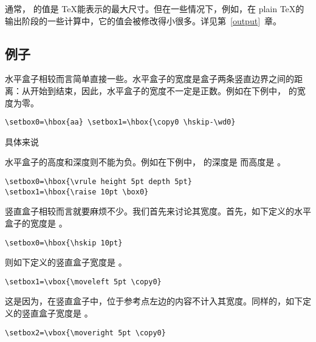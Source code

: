 \documentclass{book}
\begin{document}
通常， 的值是 \TeX 能表示的最大尺寸。但在一些情况下，例如，在 plain \TeX 的输出阶段的一些计算中，它的值会被修改得小很多。详见第~\ref{output}~章。

\subsection{例子}

水平盒子相较而言简单直接一些。水平盒子的宽度是盒子两条竖直边界之间的距离：从开始到结束，因此，水平盒子的宽度不一定是正数。例如在下例中， 的宽度为零。
\begin{verbatim}
\setbox0=\hbox{aa} \setbox1=\hbox{\copy0 \hskip-\wd0}
\end{verbatim}
具体来说
水平盒子的高度和深度则不能为负。例如在下例中， 的深度是 \n{0pt} 而高度是 \n{15pt}。
\begin{verbatim}
\setbox0=\hbox{\vrule height 5pt depth 5pt}
\setbox1=\hbox{\raise 10pt \box0}
\end{verbatim}

竖直盒子相较而言就要麻烦不少。我们首先来讨论其宽度。首先，如下定义的水平盒子的宽度是 \n{10pt}。
\begin{verbatim}
\setbox0=\hbox{\hskip 10pt}
\end{verbatim}
则如下定义的竖直盒子宽度是 \n{5pt}。
\begin{verbatim}
\setbox1=\vbox{\moveleft 5pt \copy0}
\end{verbatim}
这是因为，在竖直盒子中，位于参考点左边的内容不计入其宽度。同样的，如下定义的竖直盒子宽度是 \n{15pt}。
\begin{verbatim}
\setbox2=\vbox{\moveright 5pt \copy0}
\end{verbatim}
\end{document}
